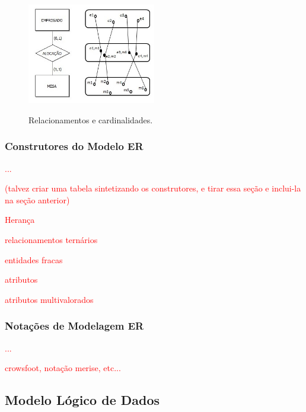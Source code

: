 \begin{figure}[htb]
	\centering
	\caption{Relacionamentos e cardinalidades.}
		\includegraphics[width=0.5\textwidth]{img/RelCard.jpg}
	\label{fig:DER2}
\end{figure}

\subsubsection{Construtores do Modelo ER} \label{sssec:ModeloER}

\textcolor{red}{...}

\textcolor{red}{(talvez criar uma tabela sintetizando os construtores, e tirar essa seção e inclui-la na seção anterior)}

\textcolor{red}{Herança}

\textcolor{red}{relacionamentos ternários}

\textcolor{red}{entidades fracas}

\textcolor{red}{atributos}

\textcolor{red}{atributos multivalorados}
    
\subsubsection{Notações de Modelagem ER} \label{sssec:ModeloER}
    
\textcolor{red}{ ... }
    
\textcolor{red}{crowsfoot, notação merise, etc...}

    \subsection{Modelo Lógico de Dados} \label{ssec:ModelLogico}

